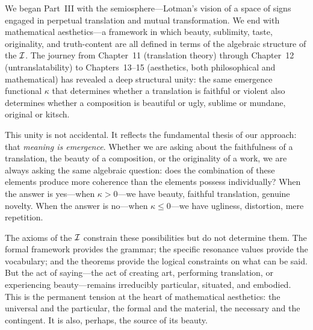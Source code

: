 \begin{remark}
\label{rem:coda-signs-emergence}
We began Part~III with the semiosphere---Lotman's vision of a space of signs engaged in perpetual translation and mutual transformation.  We end with mathematical aesthetics---a framework in which beauty, sublimity, taste, originality, and truth-content are all defined in terms of the algebraic structure of the $\mathcal{I}$.  The journey from Chapter~11 (translation theory) through Chapter~12 (untranslatability) to Chapters~13--15 (aesthetics, both philosophical and mathematical) has revealed a deep structural unity: the same emergence functional $\kappa$ that determines whether a translation is faithful or violent also determines whether a composition is beautiful or ugly, sublime or mundane, original or kitsch.

This unity is not accidental.  It reflects the fundamental thesis of our approach: that \emph{meaning is emergence}.  Whether we are asking about the faithfulness of a translation, the beauty of a composition, or the originality of a work, we are always asking the same algebraic question: does the combination of these elements produce more coherence than the elements possess individually?  When the answer is yes---when $\kappa > 0$---we have beauty, faithful translation, genuine novelty.  When the answer is no---when $\kappa \leq 0$---we have ugliness, distortion, mere repetition.

The axioms of the $\mathcal{I}$ constrain these possibilities but do not determine them.  The formal framework provides the grammar; the specific resonance values provide the vocabulary; and the theorems provide the logical constraints on what can be said.  But the act of saying---the act of creating art, performing translation, or experiencing beauty---remains irreducibly particular, situated, and embodied.  This is the permanent tension at the heart of mathematical aesthetics: the universal and the particular, the formal and the material, the necessary and the contingent.  It is also, perhaps, the source of its beauty.
\end{remark}

